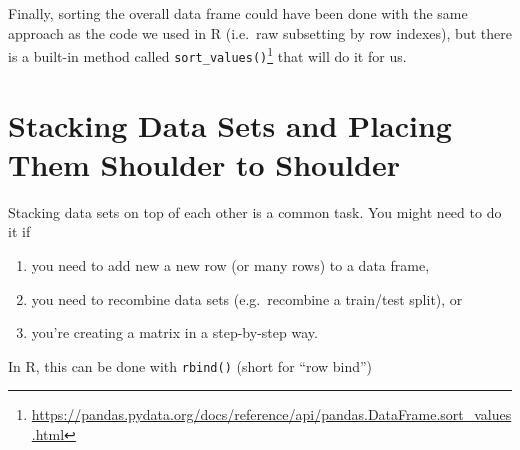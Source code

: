 \documentclass[
  12pt,
  krantz2]{krantz}
\providecommand{\tightlist}{%
  \setlength{\itemsep}{0pt}\setlength{\parskip}{0pt}}
\renewcommand{\href}[2]{#2\footnote{\url{#1}}}
\begin{document}
Finally, sorting the overall data frame could have been done with the same approach as the code we used in R (i.e.~raw subsetting by row indexes), but there is a built-in method called \href{https://pandas.pydata.org/docs/reference/api/pandas.DataFrame.sort_values.html}{\texttt{sort\_values()}} that will do it for us.

\hypertarget{stacking-data-sets-and-placing-them-shoulder-to-shoulder}{%
\section{Stacking Data Sets and Placing Them Shoulder to Shoulder}\label{stacking-data-sets-and-placing-them-shoulder-to-shoulder}}

Stacking data sets on top of each other is a common task. You might need to do it if

\begin{enumerate}
\def\labelenumi{\arabic{enumi}.}
\tightlist
\item
  you need to add new a new row (or many rows) to a data frame,
\item
  you need to recombine data sets (e.g.~recombine a train/test split), or
\item
  you're creating a matrix in a step-by-step way.
\end{enumerate}

In R, this can be done with \texttt{rbind()} (short for ``row bind'')
\end{document}
